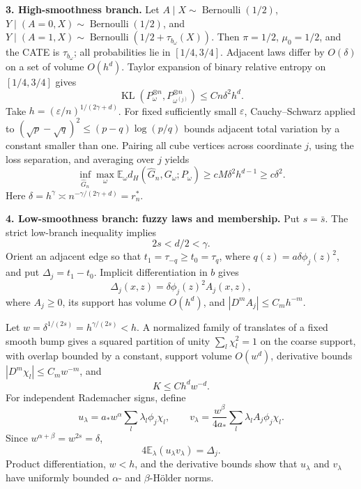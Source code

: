 \textbf{3. High-smoothness branch.} Let \(A\mid X\sim\operatorname{Bernoulli}(1/2)\), \(Y\mid(A=0,X)\sim\operatorname{Bernoulli}(1/2)\), and \(Y\mid(A=1,X)\sim\operatorname{Bernoulli}(1/2+\tau_{b_\omega}(X))\). Then \(\pi=1/2\), \(\mu_0=1/2\), and the CATE is \(\tau_{b_\omega}\); all probabilities lie in \([1/4,3/4]\). Adjacent laws differ by \(O(\delta)\) on a set of volume \(O(h^d)\). Taylor expansion of binary relative entropy on \([1/4,3/4]\) gives
\[
\operatorname{KL}(P_\omega^{\otimes n},P_{\omega^{(j)}}^{\otimes n})
 \le Cn\delta^2h^d.
\]
Take \(h=(\varepsilon/n)^{1/(2\gamma+d)}\). For fixed sufficiently small \(\varepsilon\), Cauchy--Schwarz applied to \((\sqrt p-\sqrt q)^2\le(p-q)\log(p/q)\) bounds adjacent total variation by a constant smaller than one. Pairing all cube vertices across coordinate \(j\), using the loss separation, and averaging over \(j\) yields
\[
\inf_{\widehat G_n}\max_\omega
 \mathbb E_\omega d_H(\widehat G_n,G_\omega;P_\omega)
 \ge cM\delta^2h^{d-1}\ge c\delta^2.
\]
Here \(\delta=h^\gamma\asymp n^{-\gamma/(2\gamma+d)}=r_n^*\).

\textbf{4. Low-smoothness branch: fuzzy laws and membership.} Put \(s=\bar s\). The strict low-branch inequality implies
\[
2s<d/2<\gamma.
\]
Orient an adjacent edge so that \(t_1=\tau_{-q}\ge t_0=\tau_q\), where \(q(z)=a\delta\phi_j(z)^2\), and put \(\Delta_j=t_1-t_0\). Implicit differentiation in \(b\) gives
\[
\Delta_j(x,z)=\delta\phi_j(z)^2A_j(x,z),
\]
where \(A_j\ge0\), its support has volume \(O(h^d)\), and \(|D^mA_j|\le C_mh^{-m}\).

Let \(w=\delta^{1/(2s)}=h^{\gamma/(2s)}<h\). A normalized family of translates of a fixed smooth bump gives a squared partition of unity \(\sum_l\chi_l^2=1\) on the coarse support, with overlap bounded by a constant, support volume \(O(w^d)\), derivative bounds \(|D^m\chi_l|\le C_mw^{-m}\), and
\[
K\le Ch^dw^{-d}.
\]
For independent Rademacher signs, define
\[
u_\lambda=a_*w^\alpha\sum_l\lambda_l\phi_j\chi_l,
\qquad
v_\lambda=\frac{w^\beta}{4a_*}
 \sum_l\lambda_lA_j\phi_j\chi_l.
\]
Since \(w^{\alpha+\beta}=w^{2s}=\delta\),
\[
4\mathbb E_\lambda(u_\lambda v_\lambda)=\Delta_j.
\]
Product differentiation, \(w<h\), and the derivative bounds show that \(u_\lambda\) and \(v_\lambda\) have uniformly bounded \(\alpha\)- and \(\beta\)-Hölder norms.

